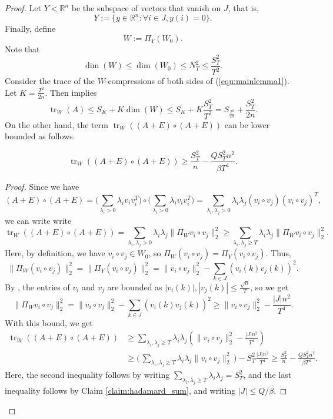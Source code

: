 \documentclass[10pt,a4paper]{amsart}
\DeclareMathOperator{\trace}{tr}
\begin{document}
\begin{proof}
Let $Y<\mathbb{R}^n$ be the subspace of vectors that vanish on $J$, that is, 
$$Y:=\{y\in\mathbb{R}^n:\forall i\in J, y(i)=0\}.$$ Finally, define $$W:=\Pi_Y(W_0).$$
Note that $$\dim(W)\leq \dim(W_0)\leq N_T^2\leq \frac{S_T^2}{T^2}.$$
Consider the trace of the $W$-compressions of both sides of (\ref{equ:mainlemma1}). 
Let $K=\frac{T^2}{2n}$. 
Then  implies
$$\trace_W(A)\leq S_K+K\dim(W)\leq S_{K}+K\frac{S_T^2}{T^2}= S_{\frac{T^2}{2n}}+\frac{S_T^2}{2n}.$$
On the other hand, the term $\trace_W((A+E)\circ (A+E))$ can be lower bounded as follows.
\begin{claim}
    \[\trace_W((A+E)\circ (A+E))\geq \frac{S_T^2}{n}-\frac{Q  S_T^2 n^2}{\beta T^4}.\]    
\end{claim}
\begin{proof}
Since we have 
\begin{equation*}
(A+E)\circ (A+E)=  \bigg(\sum_{\lambda_i>0}\lambda_iv_iv_i^T\bigg)\circ \bigg(\sum_{\lambda_i>0}\lambda_iv_iv_i^T\bigg) =\sum_{\lambda_i,\lambda_j>0}\lambda_i\lambda_j (v_i\circ v_j)(v_i\circ v_j)^T,
\end{equation*}
we can write write
$$\trace_W((A+E)\circ (A+E))=\sum_{\lambda_i,\lambda_j>0} \lambda_i\lambda_j \|\Pi_W v_i\circ v_j\|_2^2\geq \sum_{\lambda_i,\lambda_j\geq T} \lambda_i\lambda_j \|\Pi_W v_i\circ v_j\|_2^2.$$
Here, by definition, we have $v_i\circ v_j\in W_0$, so $\Pi_W (v_i\circ v_j)=\Pi_Y (v_i\circ v_j)$. Thus,
$$\|\Pi_W (v_i\circ v_j)\|_2^2=\|\Pi_Y (v_i\circ v_j)\|_2^2=\|v_i\circ v_j\|_2^2-\sum_{k\in J} (v_i(k)v_j(k))^2.$$
By , the entries of $v_i$ and $v_j$ are bounded as $|v_i(k)|,|v_j(k)|\leq \frac{\sqrt{n}}{T}$, so we get
$$\big\|\Pi_W v_i\circ v_j \big\|_2^2
    =\|v_i\circ v_j\|_2^2-\sum_{k\in J} (v_i(k)v_j(k))^2
    \geq \|v_i\circ v_j\|_2^2-\frac{|J|n^2}{T^4}.$$
With this bound, we get 
\begin{align*}
    \trace_W((A+E)\circ (A+E))&\geq \sum_{\lambda_i,\lambda_j\geq T} \lambda_i\lambda_j\left(\|v_i\circ v_j\|_2^2-\frac{|J|n^2}{T^4}\right)\\
    &\geq \bigg(\,\sum_{\lambda_i,\lambda_j\geq T}\lambda_i\lambda_j\|v_i\circ v_j\|_2^2\,\bigg)-S_T^2\frac{|J|n^2}{T^4}
    \geq  \frac{S_T^2}{n}-\frac{Q  S_T^2 n^2}{\beta T^4}.
\end{align*}
Here, the second inequality follows by writing $\sum_{\lambda_i,\lambda_j\geq T}\lambda_i\lambda_j=S_T^2$, and the last inequality follows by Claim \ref{claim:hadamard_sum}, and writing  $|J|\leq Q/\beta$.
\end{proof}


\end{proof}
\end{document}
